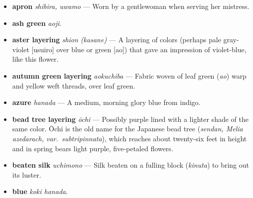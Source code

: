 \documentclass{article}
\begin{document}
\setlength{\columnsep}{4em}
\begin{multicols}{3}
	\begin{footnotesize}%
	\begin{itemize}[
			label=,
			leftmargin=0em,
			rightmargin=-1.5em,
			itemindent=-2em,
			nosep,
		]
		\setlength{\itemsep}{0.2em}


		\item \textbf{apron} \textit{shibira, uwamo} --- Worn by a gentlewoman when serving her mistress.

		\item \textbf{ash green} \textit{aoji}.

		\item \textbf{aster layering} \textit{shion (\textit{kasane})} --- A layering of colors (perhaps pale gray-violet [usuiro] over blue or green [ao]) that gave an impression of violet-blue, like this flower.

		\item \textbf{autumn green layering} \textit{aokuchiba} --- Fabric woven of leaf green (\textit{ao}) warp and yellow weft threads, over leaf green.

		\item \textbf{azure} \textit{hanada} --- A medium, morning glory blue from indigo.

		\item \textbf{bead tree layering} \textit{ōchi} --- Possibly purple lined with a lighter shade of the same color.
		      Ōchi is the old name for the Japanese bead tree
		      (\textit{sendan, Melia azedarach, var.\ subtripinnata}),
		      which reaches about twenty-six feet in height and in spring bears light purple, five-petaled flowers.

		\item \textbf{beaten silk} \textit{uchimono} --- Silk beaten on a fulling block (\textit{kinuta}) to bring out its luster.

		\item \textbf{blue} \textit{koki hanada}.


\end{itemize}
\end{footnotesize}
\end{multicols}
\end{document}
